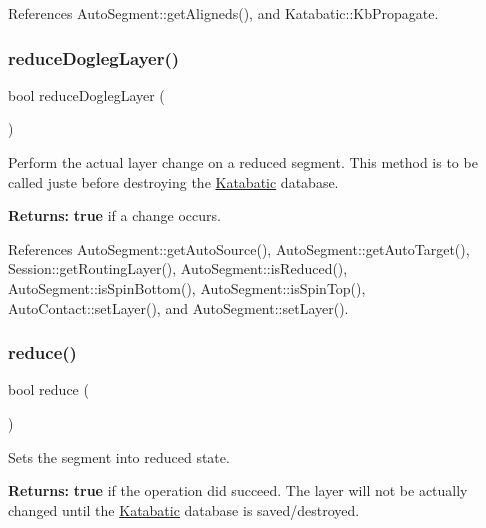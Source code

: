  

References Auto\+Segment\+::get\+Aligneds(), and Katabatic\+::\+Kb\+Propagate.

\mbox{\label{classKatabatic_1_1AutoSegment_acecc9a1d55a271a4b1587d7872cfe133}} 
\subsubsection{\texorpdfstring{reduce\+Dogleg\+Layer()}{reduceDoglegLayer()}}
{\footnotesize\ttfamily bool reduce\+Dogleg\+Layer (\begin{DoxyParamCaption}{ }\end{DoxyParamCaption})}

Perform the actual layer change on a reduced segment. This method is to be called juste before destroying the \mbox{\hyperlink{namespaceKatabatic}{Katabatic}} database.

{\bfseries Returns\+:} {\bfseries true} if a change occurs. 

References Auto\+Segment\+::get\+Auto\+Source(), Auto\+Segment\+::get\+Auto\+Target(), Session\+::get\+Routing\+Layer(), Auto\+Segment\+::is\+Reduced(), Auto\+Segment\+::is\+Spin\+Bottom(), Auto\+Segment\+::is\+Spin\+Top(), Auto\+Contact\+::set\+Layer(), and Auto\+Segment\+::set\+Layer().

\mbox{\label{classKatabatic_1_1AutoSegment_a27a6a2c747ff93d209878a32d97e9157}} 
\subsubsection{\texorpdfstring{reduce()}{reduce()}}
{\footnotesize\ttfamily bool reduce (\begin{DoxyParamCaption}{ }\end{DoxyParamCaption})}

Sets the segment into reduced state.

{\bfseries Returns\+:} {\bfseries true} if the operation did succeed. The layer will not be actually changed until the \mbox{\hyperlink{namespaceKatabatic}{Katabatic}} database is saved/destroyed.

